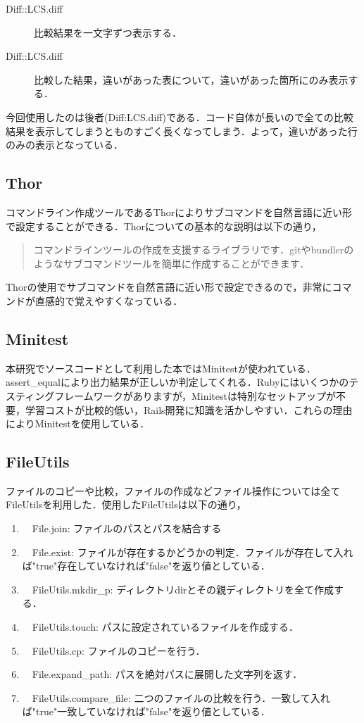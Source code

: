 \begin{description}
\item[Diff::LCS.diff]
比較結果を一文字ずつ表示する．
\item[Diff::LCS.diff]
比較した結果，違いがあった表について，違いがあった箇所にのみ表示する．
\end{description}
今回使用したのは後者(Diff:LCS.diff)である．コード自体が長いので全ての比較結果を表示してしまうとものすごく長くなってしまう．よって，違いがあった行のみの表示となっている．

    \subsection{Thor}\label{thor}

    コマンドライン作成ツールであるThorによりサブコマンドを自然言語に近い形で設定することができる．Thorについての基本的な説明は以下の通り，
\begin{quotation}
コマンドラインツールの作成を支援するライブラリです．gitやbundlerのようなサブコマンドツールを簡単に作成することができます． \cite{thor}
\end{quotation}
Thorの使用でサブコマンドを自然言語に近い形で設定できるので，非常にコマンドが直感的で覚えやすくなっている．

    \subsection{Minitest}\label{minitest}

    本研究でソースコードとして利用した本ではMinitestが使われている．assert\_equalにより出力結果が正しいか判定してくれる．Rubyにはいくつかのテスティングフレームワークがありますが，Minitestは特別なセットアップが不要，学習コストが比較的低い，Rails開発に知識を活かしやすい．これらの理由によりMinitestを使用している．

    \subsection{FileUtils}\label{fileutils}

ファイルのコピーや比較，ファイルの作成などファイル操作については全てFileUtilsを利用した．使用したFileUtilsは以下の通り，

\begin{enumerate}
\def\labelenumi{\arabic{enumi}.}
\tightlist
\item
　File.join: ファイルのパスとパスを結合する
\item
　File.exist: ファイルが存在するかどうかの判定．ファイルが存在して入れば"true"存在していなければ"false"を返り値としている．
\item
　FileUtils.mkdir\_p: ディレクトリdirとその親ディレクトリを全て作成する．
\item
　FileUtils.touch: パスに設定されているファイルを作成する．
\item
　FileUtils.cp: ファイルのコピーを行う．
\item
　File.expand\_path: パスを絶対パスに展開した文字列を返す．
\item
　FileUtils.compare\_file: 二つのファイルの比較を行う．一致して入れば"true"一致していなければ"false"を返り値としている．
\end{enumerate}

